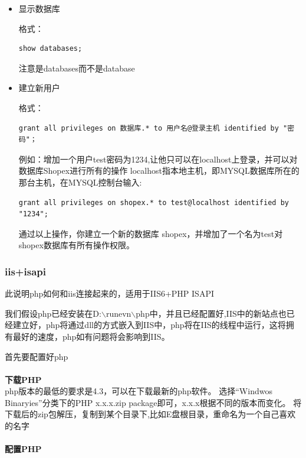 \documentclass{article}
\begin{document}
\begin{itemize}
\item 显示数据库

格式：
\begin{verbatim}
show databases;
\end{verbatim}
注意是databases而不是database

\item 建立新用户

格式：
\begin{verbatim}
grant all privileges on 数据库.* to 用户名@登录主机 identified by "密码"；
\end{verbatim}

例如：增加一个用户test密码为1234,让他只可以在localhost上登录，并可以对数据库Shopex进行所有的操作
localhost指本地主机，即MYSQL数据库所在的那台主机，在MYSQL控制台输入:
\begin{verbatim}
grant all privileges on shopex.* to test@localhost identified by "1234";
\end{verbatim}
通过以上操作，你建立一个新的数据库 shopex，并增加了一个名为test对shopex数据库有所有操作权限。
\end{itemize}

\hypertarget{toc9}{}
\subsubsection{iis+isapi}
此说明php如何和iis连接起来的，适用于IIS6+PHP ISAPI

我们假设php已经安装在D:$\backslash$runevn$\backslash$php中，并且已经配置好,IIS中的新站点也已经建立好，php将通过dll的方式嵌入到IIS中，php将在IIS的线程中运行，这将拥有最好的速度，php如有问题将会影响到IIS。

首先要配置好php

\paragraph{}\textbf{下载PHP}\\

php版本的最低的要求是4.3，可以在下载最新的php软件。
选择“Windwos Binaryies”分类下的PHP x.x.x.zip package即可，x.x.x根据不同的版本而变化。
将下载后的zip包解压，复制到某个目录下,比如E盘根目录，重命名为一个自己喜欢的名字 

\paragraph{}\textbf{配置PHP}\\
\end{document}
